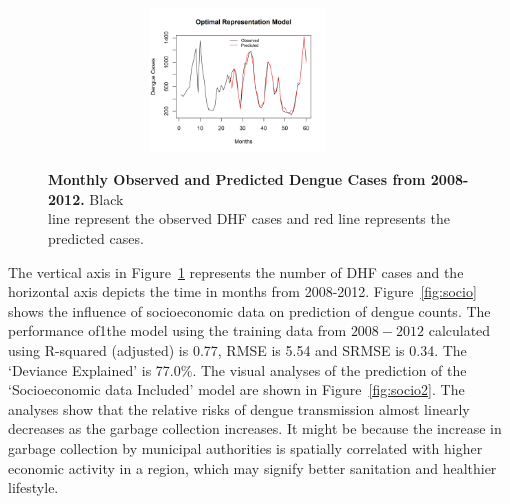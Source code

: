 \documentclass{bmcart}
\begin{document}
\begin{figure}[htbp]
\begin{minipage}[c]{1.0\textwidth}
		\label{fig:test4} \par\vfill
		\includegraphics[width=10cm,height=3.8cm]{16-Pred-OptimalRepresentation}
		\label{fig:test5}
	\end{minipage}
	\caption{\textbf{Monthly Observed and Predicted Dengue Cases from 2008-2012.} Black \\ line represent the observed DHF cases and red line represents the predicted cases.}
	\label{fig:lolo}
\end{figure}

The vertical axis in Figure~\ref{fig:lolo} represents the number of DHF cases and the horizontal axis depicts the time in months from 2008-2012. Figure~\ref{fig:socio} shows the influence of socioeconomic data on prediction of dengue counts. The performance of1the model using the training data from $2008-2012$ calculated using R-squared (adjusted) is 0.77, RMSE is 5.54 and SRMSE is 0.34. The `Deviance Explained' is 77.0\%. The visual analyses of the prediction of the `Socioeconomic data Included' model are shown in Figure~\ref{fig:socio2}. The analyses show that the relative risks of dengue transmission almost linearly decreases as the garbage collection increases. It might be because the increase in garbage collection by municipal authorities is spatially correlated with higher economic activity in a region, which may signify better sanitation and healthier lifestyle\cite{satterthwaite1997environmental}. 
\end{document}
